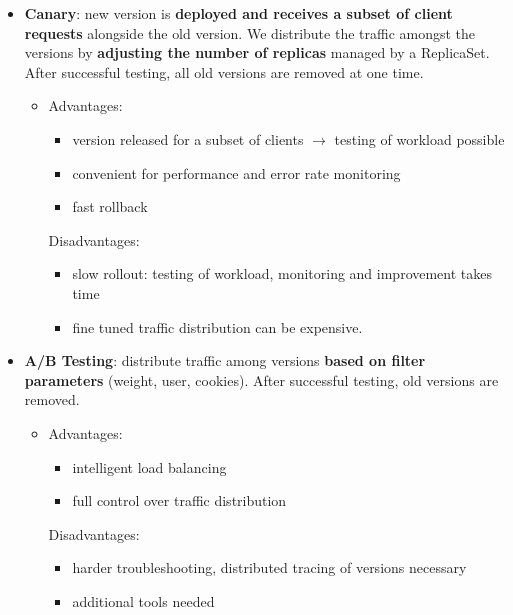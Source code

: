 \begin{itemize}
	\item \textbf{Canary}: new version is \textbf{deployed and receives a subset of client requests} alongside the old version. We distribute the traffic amongst the versions by \textbf{adjusting the number of replicas} managed by a ReplicaSet.
	 After successful testing, all old versions are removed at one time.
	
	
	
	\begin{itemize}
		\item Advantages:
		\begin{itemize}
			\item version released for a subset of clients $\rightarrow$ testing of workload possible
			\item convenient for performance and error rate monitoring
			\item fast rollback 
		\end{itemize}
		Disadvantages:
		\begin{itemize}
			\item slow rollout: testing of workload, monitoring and improvement takes time
			\item fine tuned traffic distribution can be expensive. 
		\end{itemize}
	
	\end{itemize}
	
	\item \textbf{A/B Testing}: distribute traffic among versions \textbf{based on filter parameters} (weight, user, cookies). After successful testing, old versions are removed. 
	
	\begin{itemize}
		\item Advantages:
		\begin{itemize}
			\item intelligent load balancing
			\item full control over traffic distribution
		\end{itemize}
		Disadvantages:
		\begin{itemize}
			\item harder troubleshooting, distributed tracing of versions necessary
			\item additional tools needed
		\end{itemize}
		
		
		
	\end{itemize}
\end{itemize}
